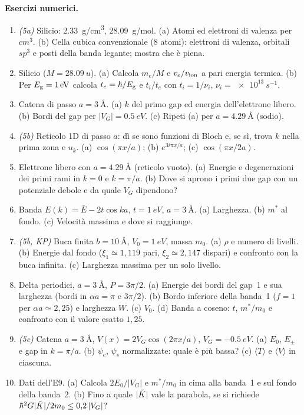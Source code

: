 \documentclass[11pt,a4paper]{article}
\begin{document}
\textbf{Esercizi numerici.}
\begin{enumerate}[label=\textbf{E\arabic*.}, leftmargin=2.3em, itemsep=2pt]
\item \emph{(5a)} Silicio: \SI{2.33}{g/cm^3}, \SI{28.09}{g/mol}. (a) Atomi ed elettroni di valenza per $\si{cm^3}$. (b) Cella cubica convenzionale (8 atomi): elettroni di valenza, orbitali $sp^3$ e posti della banda legante; mostra che è piena.
\item Silicio ($M=\SI{28.09}{u}$). (a) Calcola $m_e/M$ e $v_e/v_{\mathrm{ion}}$ a pari energia termica. (b) Per $E_{\mathrm g}=\SI{1}{eV}$ calcola $t_e=\hbar/E_{\mathrm g}$ e $t_i/t_e$ con $t_i=1/\nu_i$, $\nu_i=\SI{e13}{s^{-1}}$.
\item Catena di passo $a=\SI{3}{\angstrom}$. (a) $k$ del primo gap ed energia dell'elettrone libero. (b) Bordi del gap per $|V_G|=\SI{0.5}{eV}$. (c) Ripeti (a) per $a=\SI{4.29}{\angstrom}$ (sodio).
\item \emph{(5b)} Reticolo 1D di passo $a$: dì se sono funzioni di Bloch e, se sì, trova $k$ nella prima zona e $u_k$. (a) $\cos(\pi x/a)$; (b) $e^{3i\pi x/a}$; (c) $\cos(\pi x/2a)$.
\item Elettrone libero con $a=\SI{4.29}{\angstrom}$ (reticolo vuoto). (a) Energie e degenerazioni dei primi rami in $k=0$ e $k=\pi/a$. (b) Dove si aprono i primi due gap con un potenziale debole e da quale $V_G$ dipendono?
\item Banda $E(k)=\bar E-2t\cos ka$, $t=\SI{1}{eV}$, $a=\SI{3}{\angstrom}$. (a) Larghezza. (b) $m^*$ al fondo. (c) Velocità massima e dove si raggiunge.
\item \emph{(5b, KP)} Buca finita $b=\SI{10}{\angstrom}$, $V_0=\SI{1}{eV}$, massa $m_0$. (a) $\rho$ e numero di livelli. (b) Energie dal fondo ($\xi_1\simeq1{,}119$ pari, $\xi_2\simeq2{,}147$ dispari) e confronto con la buca infinita. (c) Larghezza massima per un solo livello.
\item Delta periodici, $a=\SI{3}{\angstrom}$, $P=3\pi/2$. (a) Energie dei bordi del gap~1 e sua larghezza (bordi in $\alpha a=\pi$ e $3\pi/2$). (b) Bordo inferiore della banda~1 ($f=1$ per $\alpha a\simeq2{,}25$) e larghezza $W$. (c) $V_0$. (d) Banda a coseno: $t$, $m^*/m_0$ e confronto con il valore esatto $1{,}25$.
\item \emph{(5c)} Catena $a=\SI{3}{\angstrom}$, $V(x)=2V_G\cos(2\pi x/a)$, $V_G=\SI{-0.5}{eV}$. (a) $E_0$, $E_\pm$ e gap in $k=\pi/a$. (b) $\psi_c$, $\psi_s$ normalizzate: quale è più bassa? (c) $\langle T\rangle$ e $\langle V\rangle$ in ciascuna.
\item Dati dell'E9. (a) Calcola $2E_0/|V_G|$ e $m^*/m_0$ in cima alla banda~1 e sul fondo della banda~2. (b) Fino a quale $|\tilde K|$ vale la parabola, se si richiede $\hbar^2G|\tilde K|/2m_0\le0{,}2\,|V_G|$?

\end{enumerate}
\end{document}
